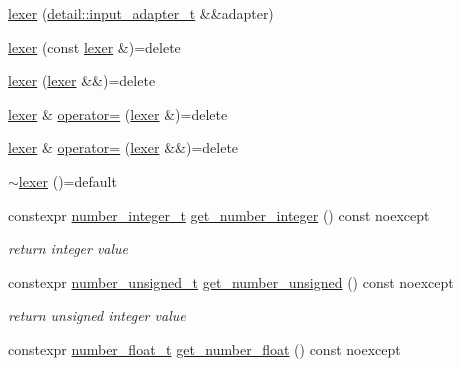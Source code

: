 \begin{DoxyCompactItemize}
\item 
\hyperlink{classnlohmann_1_1detail_1_1lexer_ab6818e0fc05f4a52c65aeb967dd79919}{lexer} (\hyperlink{namespacenlohmann_1_1detail_ae132f8cd5bb24c5e9b40ad0eafedf1c2}{detail\+::input\+\_\+adapter\+\_\+t} \&\&adapter)
\item 
\hyperlink{classnlohmann_1_1detail_1_1lexer_a2e8ce2a0d266d148b69dfbcc2e4ad71a}{lexer} (const \hyperlink{classnlohmann_1_1detail_1_1lexer}{lexer} \&)=delete
\item 
\hyperlink{classnlohmann_1_1detail_1_1lexer_a9045348915010649fad1f15e80b6e34d}{lexer} (\hyperlink{classnlohmann_1_1detail_1_1lexer}{lexer} \&\&)=delete
\item 
\hyperlink{classnlohmann_1_1detail_1_1lexer}{lexer} \& \hyperlink{classnlohmann_1_1detail_1_1lexer_a33e97dee7c5faf1b36aff5b74a6c8f55}{operator=} (\hyperlink{classnlohmann_1_1detail_1_1lexer}{lexer} \&)=delete
\item 
\hyperlink{classnlohmann_1_1detail_1_1lexer}{lexer} \& \hyperlink{classnlohmann_1_1detail_1_1lexer_af8ab91a774484fa220ba073421c8f452}{operator=} (\hyperlink{classnlohmann_1_1detail_1_1lexer}{lexer} \&\&)=delete
\item 
\hyperlink{classnlohmann_1_1detail_1_1lexer_a2f2ef6f5aca9a0c48fcfb1290f7b2b0d}{$\sim$lexer} ()=default
\item 
constexpr \hyperlink{classnlohmann_1_1detail_1_1lexer_a9cd1b11cc67edbfb2613c788b5bd337c}{number\+\_\+integer\+\_\+t} \hyperlink{classnlohmann_1_1detail_1_1lexer_afa338d17c0a7e834c73104258a2c8ced}{get\+\_\+number\+\_\+integer} () const noexcept
\begin{DoxyCompactList}\small\item\em return integer value \end{DoxyCompactList}\item 
constexpr \hyperlink{classnlohmann_1_1detail_1_1lexer_a105d1dfeab414a572655895cdd96a52a}{number\+\_\+unsigned\+\_\+t} \hyperlink{classnlohmann_1_1detail_1_1lexer_a56640fb92293e0c17742ca3c814d74d6}{get\+\_\+number\+\_\+unsigned} () const noexcept
\begin{DoxyCompactList}\small\item\em return unsigned integer value \end{DoxyCompactList}\item 
constexpr \hyperlink{classnlohmann_1_1detail_1_1lexer_aa7f9e7b2bcd311fb86e2da43761a6619}{number\+\_\+float\+\_\+t} \hyperlink{classnlohmann_1_1detail_1_1lexer_ac013af35a21e9387993b19da5b3e0ae2}{get\+\_\+number\+\_\+float} () const noexcept

\end{DoxyCompactItemize}
